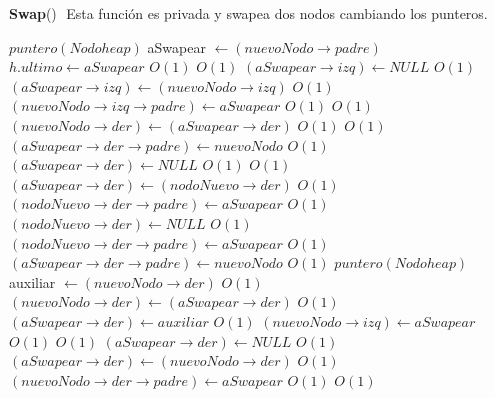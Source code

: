\begin{Algoritmos}
{\textbf{Swap}()} $ $\newline
$ $\Comment Esta funci\'on es privada y swapea dos nodos cambiando los punteros.
    	\begin{algorithmic}[1]
    		\State $puntero(Nodoheap)$ aSwapear $\gets (nuevoNodo \rightarrow padre)$
    			\State $h.ultimo \gets aSwapear$
    		\EndIf
			 \Comment $O(1)$
						 \Comment $O(1)$
								\State $(aSwapear \rightarrow izq) \gets NULL$ \Comment $O(1)$
							\Else
								\State $(aSwapear \rightarrow izq) \gets (nuevoNodo \rightarrow izq)$ \Comment $O(1)$
								\State $(nuevoNodo \rightarrow izq \rightarrow padre) \gets aSwapear$ \Comment $O(1)$
							\EndIf
							 \Comment $O(1)$
								\State $(nuevoNodo \rightarrow der) \gets (aSwapear \rightarrow der)$ \Comment $O(1)$
								 \Comment $O(1)$
								\State $(aSwapear \rightarrow der \rightarrow padre) \gets nuevoNodo$	 \Comment $O(1)$						
								\EndIf
								\State $(aSwapear \rightarrow der) \gets NULL$ \Comment $O(1)$
							\Else
								 \Comment $O(1)$
									\State $(aSwapear \rightarrow der) \gets (nodoNuevo \rightarrow der)$ \Comment $O(1)$
									\State $(nodoNuevo \rightarrow der \rightarrow padre) \gets aSwapear$ \Comment $O(1)$
									\State $(nodoNuevo \rightarrow der) \gets NULL$ \Comment $O(1)$
								\Else
									\State $(nodoNuevo \rightarrow der \rightarrow padre) \gets aSwapear$ \Comment $O(1)$
									\State $(aSwapear \rightarrow der \rightarrow padre) \gets nuevoNodo$ \Comment $O(1)$
									\State $puntero(Nodoheap)$ auxiliar $\gets (nuevoNodo \rightarrow der)$ \Comment $O(1)$
									\State $(nuevoNodo \rightarrow der) \gets (aSwapear \rightarrow der)$ \Comment $O(1)$
									\State $(aSwapear \rightarrow der) \gets auxiliar$ \Comment $O(1)$
								\EndIf
							\EndIf
						\State $(nuevoNodo \rightarrow izq) \gets aSwapear$ \Comment $O(1)$
					\Else
						 \Comment $O(1)$
								\State $(aSwapear \rightarrow der) \gets NULL$ \Comment $O(1)$
							\Else
								\State $(aSwapear \rightarrow der) \gets (nuevoNodo \rightarrow der)$ \Comment $O(1)$
								\State $(nuevoNodo \rightarrow der \rightarrow padre) \gets aSwapear$ \Comment $O(1)$
							\EndIf
							 \Comment $O(1)$

\end{algorithmic}
\end{Algoritmos}
